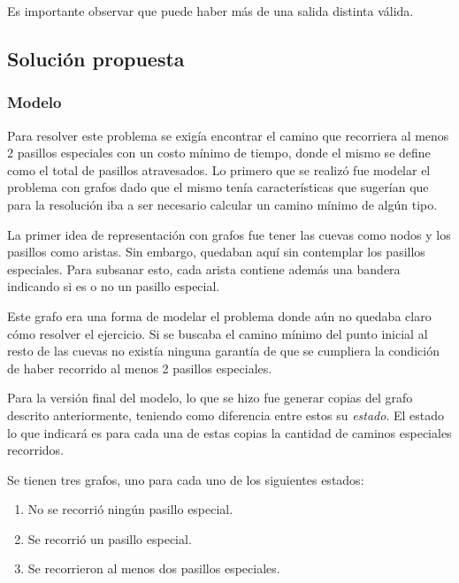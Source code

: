     Es importante observar que puede haber más de una salida distinta válida.

    \subsection{Solución propuesta}

	\subsubsection{Modelo}

	Para resolver este problema se exigía encontrar el camino que recorriera al
	menos 2 pasillos especiales con un costo mínimo de tiempo, donde el mismo se
	define como el total de pasillos atravesados. Lo primero que se realizó fue
	modelar el problema con grafos dado que el mismo tenía características que
	sugerían que para la resolución iba a ser necesario calcular un camino mínimo de algún tipo.

	La primer idea de representación con grafos fue tener las cuevas como nodos y
	los pasillos como aristas. Sin embargo, quedaban aquí sin contemplar los
	pasillos especiales. Para subsanar esto, cada arista contiene además una bandera
	indicando si es o no un pasillo especial.

	Este grafo era una forma de modelar el problema donde aún no quedaba claro
	cómo resolver el ejercicio. Si se buscaba el camino mínimo del punto inicial
	al resto de las cuevas no existía ninguna garantía de que se cumpliera la
	condición de haber recorrido al menos 2 pasillos especiales.

	Para la versión final del modelo, lo que se hizo fue generar copias del
	grafo descrito anteriormente, teniendo como diferencia entre estos su
	\emph{estado}. El estado lo que indicará es para cada una de estas copias la
	cantidad de caminos especiales recorridos.

	Se tienen tres grafos, uno para cada uno de los siguientes estados:

	\begin{enumerate}
		\item{No se recorrió ningún pasillo especial.}
		\item{Se recorrió un pasillo especial.}
		\item{Se recorrieron al menos dos pasillos especiales.}
	\end{enumerate}

